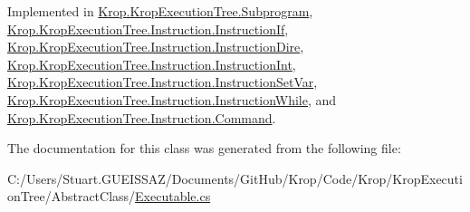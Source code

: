 Implemented in \mbox{\hyperlink{class_krop_1_1_krop_execution_tree_1_1_subprogram_ae33466ddf0761f860c5817a4263efd29}{Krop.\+Krop\+Execution\+Tree.\+Subprogram}}, \mbox{\hyperlink{class_krop_1_1_krop_execution_tree_1_1_instruction_1_1_instruction_if_a69ee340a90824643f703e28e2ab665a1}{Krop.\+Krop\+Execution\+Tree.\+Instruction.\+Instruction\+If}}, \mbox{\hyperlink{class_krop_1_1_krop_execution_tree_1_1_instruction_1_1_instruction_dire_aef86c4e6b9ac3a4d17ed0c88db50a894}{Krop.\+Krop\+Execution\+Tree.\+Instruction.\+Instruction\+Dire}}, \mbox{\hyperlink{class_krop_1_1_krop_execution_tree_1_1_instruction_1_1_instruction_int_ac2e3bee4e5a115c09e03815df9f6ae0e}{Krop.\+Krop\+Execution\+Tree.\+Instruction.\+Instruction\+Int}}, \mbox{\hyperlink{class_krop_1_1_krop_execution_tree_1_1_instruction_1_1_instruction_set_var_a1c6739bcdc66cc9f50a8c9810958ed9f}{Krop.\+Krop\+Execution\+Tree.\+Instruction.\+Instruction\+Set\+Var}}, \mbox{\hyperlink{class_krop_1_1_krop_execution_tree_1_1_instruction_1_1_instruction_while_a98200d1758042e65604af4ad3cf95c9c}{Krop.\+Krop\+Execution\+Tree.\+Instruction.\+Instruction\+While}}, and \mbox{\hyperlink{class_krop_1_1_krop_execution_tree_1_1_instruction_1_1_command_ab0fc1d51e07e167cea0262e55e0de8af}{Krop.\+Krop\+Execution\+Tree.\+Instruction.\+Command}}.



The documentation for this class was generated from the following file\+:\begin{DoxyCompactItemize}
\item 
C\+:/\+Users/\+Stuart.\+G\+U\+E\+I\+S\+S\+A\+Z/\+Documents/\+Git\+Hub/\+Krop/\+Code/\+Krop/\+Krop\+Execution\+Tree/\+Abstract\+Class/\mbox{\hyperlink{_executable_8cs}{Executable.\+cs}}\end{DoxyCompactItemize}
